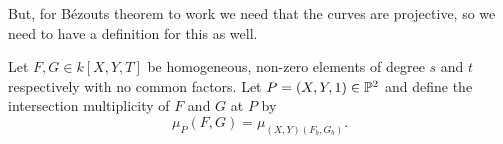 But, for Bézouts theorem to work we need that the curves are projective, so we need to have a definition for this as well. 

\begin{definition}
Let $F, G\in k[X, Y, T]$ be homogeneous, non-zero elements of degree $s$ and $t$ respectively with no common factors. Let $P=(X, Y, 1)\in \P^2$ and define the intersection multiplicity of $F$ and $G$ at $P$ by
\begin{equation*}
    \mu_P(F, G) = \mu_{(X, Y)(F_b, G_b)}. 
\end{equation*}
\end{definition}
